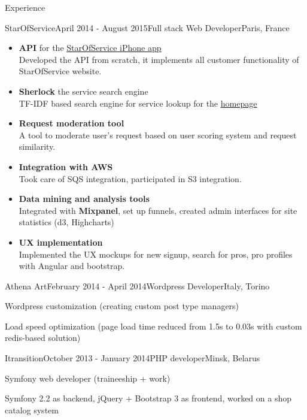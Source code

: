 \documentclass{resume} %
\begin{document}
\begin{rSection}{Experience}
\begin{rSubsection}{StarOfService}{April 2014 - August 2015}{Full stack Web Developer}{Paris, France}
\begin{itemize}[leftmargin=*,label={$+$}]
  \item {\bf API} for the \href{https://itunes.apple.com/fr/app/starofservice/id948344674?mt=8}{StarOfService iPhone app} \\
	Developed the API from scratch, it implements all customer functionality of StarOfService website.
  \item {\bf Sherlock} the service search engine \\
	TF-IDF based search engine for service lookup for the \href{http://www.starofservice.com/}{homepage}
  \item {\bf Request moderation tool} \\
	A tool to moderate user's request based on user scoring system and request similarity.
	\clearpage
  \item {\bf Integration with AWS} \\
	Took care of SQS integration, participated in S3 integration.
  \item {\bf Data mining and analysis tools} \\
	Integrated with {\bf Mixpanel}, set up funnels, created admin interfaces for site statistics (d3, Highcharts)
  \item {\bf UX implementation} \\
	Implemented the UX mockups for new signup, search for pros, pro profiles with Angular and bootstrap. 
\end{itemize}

\end{rSubsection}

\begin{rSubsection}{Athena Art}{February 2014 - April 2014}{Wordpress Developer}{Italy, Torino}
\item Wordpress customization (creating custom post type managers)
\item Load speed optimization (page load time reduced from 1.5s to 0.03s with custom redis-based solution)
\end{rSubsection}


\begin{rSubsection}{Itransition}{October 2013 - January 2014}{PHP developer}{Minsk, Belarus}
\item Symfony web developer (traineeship + work)
\item Symfony 2.2 as backend, jQuery + Bootstrap 3 as frontend, worked on a shop catalog system
\end{rSubsection}


\end{rSection}
\end{document}
